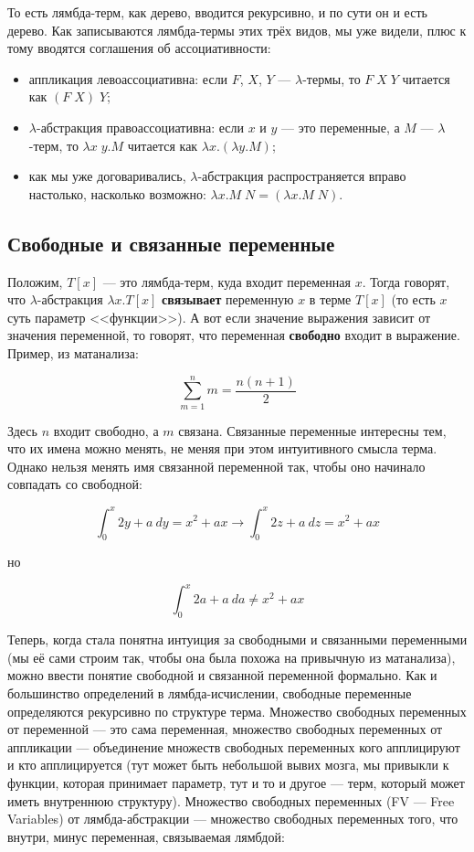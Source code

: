 \documentclass{../../text-style}
\begin{document}
То есть лямбда-терм, как дерево, вводится рекурсивно, и по сути он и есть дерево. Как записываются лямбда-термы этих трёх видов, мы уже видели, плюс к тому вводятся соглашения об ассоциативности:

\begin{itemize}
    \item аппликация левоассоциативна: если $F$, $X$, $Y$ --- $\lambda$-термы, то $F \; X \; Y$ читается как $(F \; X) \; Y$;
    \item $\lambda$-абстракция правоассоциативна: если $x$ и $y$ --- это переменные, а $M$ --- $\lambda$-терм, то $\lambda x \; y.M$ читается как $\lambda x.(\lambda y.M)$;
    \item как мы уже договаривались, $\lambda$-абстракция распространяется вправо настолько, насколько возможно: $\lambda x.M \; N = (\lambda x.M \; N)$.
\end{itemize}

\subsection{Свободные и связанные переменные}

Положим, $T[x]$ --- это лямбда-терм, куда входит переменная $x$. Тогда говорят, что $\lambda$-абстракция $\lambda x.T[x]$ \textbf{связывает} переменную $x$ в терме $T[x]$ (то есть $x$ суть параметр <<функции>>). А вот если значение выражения зависит от значения переменной, то говорят, что переменная \textbf{свободно} входит в выражение. Пример, из матанализа:

$$\sum_{m = 1}^{n} m = \frac{n(n + 1)}{2}$$

Здесь $n$ входит свободно, а $m$ связана. Связанные переменные интересны тем, что их имена можно менять, не меняя при этом интуитивного смысла терма. Однако нельзя менять имя связанной переменной так, чтобы оно начинало совпадать со свободной:

$$\int_{0}^{x}2y + a\ dy = x^2 + ax \longrightarrow \int_{0}^{x}2z + a\ dz = x^2 + ax$$

но

$$\int_{0}^{x}2a + a\ da \neq x^2 + ax$$

Теперь, когда стала понятна интуиция за свободными и связанными переменными (мы её сами строим так, чтобы она была похожа на привычную из матанализа), можно ввести понятие свободной и связанной переменной формально. Как и большинство определений в лямбда-исчислении, свободные переменные определяются рекурсивно по структуре терма. Множество свободных переменных от переменной --- это сама переменная, множество свободных переменных от аппликации --- объединение множеств свободных переменных кого апплицируют и кто апплицируется (тут может быть небольшой вывих мозга, мы привыкли к функции, которая принимает параметр, тут и то и другое --- терм, который может иметь внутреннюю структуру). Множество свободных переменных (FV --- Free Variables) от лямбда-абстракции --- множество свободных переменных того, что внутри, минус переменная, связываемая лямбдой:
\end{document}
